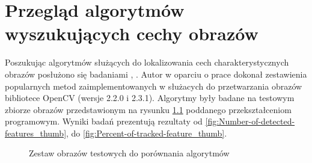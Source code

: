 \chapter{Przegląd algorytmów wyszukujących cechy obrazów}
Poszukując algorytmów służących do lokalizowania cech charakterystycznych obrazów posłużono się badaniami \cite{IK111}, \cite{IK112}. Autor w oparciu o prace \cite{LIFDAS} dokonał zestawienia popularnych metod zaimplementowanych w służacych do przetwarzania obrazów bibliotece OpenCV (wersje 2.2.0 i 2.3.1). Algorytmy były badane na testowym zbiorze obrazów przedstawionym na rysunku \ref{fig:zestaw_obrazow_start} poddanego przekształceniom programowym. Wyniki badań prezentują rezultaty od \ref{fig:Number-of-detected-features_thumb}, do \ref{fig:Percent-of-tracked-feature_thumb}.

\begin{figure}[!htb]
\begin{center}

\caption{Zestaw obrazów testowych do porównania algorytmów}
\label{fig:zestaw_obrazow_start}
\end{center}
\end{figure}

